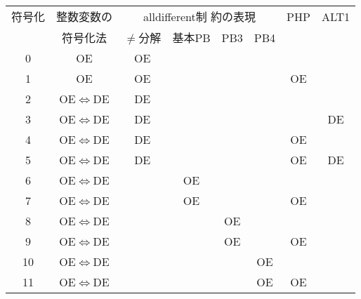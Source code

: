  \begin{tabular}[c] {c|c|c|c|c|c|c|c}
  符号化 & 整数変数の            & \multicolumn{4}{|c|}{alldifferent制
                                   約の表現} & PHP & ALT1 \\\cline{3-6}
        & 符号化法              & $\neq$分解 & 基本PB & PB3 & PB4 & & \\\hline
  0     & OE                    & OE      &    &       &             &     &      \\
  1     & OE                    & OE      &    &       &             & OE  &      \\
  2     & OE$\Leftrightarrow$DE & DE      &    &       &             &     &      \\
  3     & OE$\Leftrightarrow$DE & DE      &    &       &             &     & DE   \\
  4     & OE$\Leftrightarrow$DE & DE      &    &       &             & OE  &      \\
  5     & OE$\Leftrightarrow$DE & DE      &    &       &             & OE  & DE   \\
  6     & OE$\Leftrightarrow$DE &         & OE &       &             &     &      \\
  7     & OE$\Leftrightarrow$DE &         & OE &       &             & OE  &      \\
  8     & OE$\Leftrightarrow$DE &         &    & OE    &             &     &      \\
  9     & OE$\Leftrightarrow$DE &         &    & OE    &             & OE  &      \\
  10    & OE$\Leftrightarrow$DE &         &    &       & OE          &     &      \\
  11    & OE$\Leftrightarrow$DE &         &    &       & OE          & OE  &      \\\hline
 \end{tabular}
